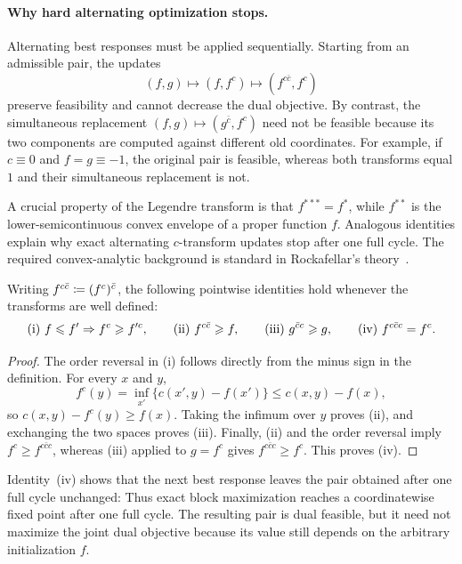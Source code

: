 \paragraph{Why hard alternating optimization stops.}

Alternating best responses must be applied sequentially. Starting from an admissible pair, the updates
\[
	(f,g)\longmapsto(f,f^c)\longmapsto(f^{c\bar c},f^c)
\]
preserve feasibility and cannot decrease the dual objective. By contrast, the simultaneous replacement $(f,g)\mapsto(g^{\bar c},f^c)$ need not be feasible because its two components are computed against different old coordinates. For example, if $c\equiv0$ and $f=g\equiv-1$, the original pair is feasible, whereas both transforms equal $1$ and their simultaneous replacement is not.

A crucial property of the Legendre transform is that $f^{***}=f^*$, while $f^{**}$ is the lower-semicontinuous convex envelope of a proper function $f$. Analogous identities explain why exact alternating $c$-transform updates stop after one full cycle. The required convex-analytic background is standard in Rockafellar's theory~\cite{rockafellar2015convex}.

\begin{prop}\label{prop-c-transform-algebra}
Writing $f^{c\bar c}\coloneqq(f^c)^{\bar c}$, the following pointwise identities hold whenever the transforms are well defined:
	\[
		\textnormal{(i) } f \leqslant f' \Rightarrow f^{c}\geqslant f'^{c},
		\qquad
		\textnormal{(ii) } f^{c\bar{c}} \geqslant f,
		\qquad
		\textnormal{(iii) } g^{\bar{c}c} \geqslant g,
		\qquad
		\textnormal{(iv) } f^{c\bar{c}c}=f^{c}.
	\]
\end{prop}

\begin{proof}
	The order reversal in (i) follows directly from the minus sign in the definition. For every $x$ and $y$,
	\[
		f^c(y)=\inf_{x'}\{c(x',y)-f(x')\}
		\leq c(x,y)-f(x),
	\]
	so $c(x,y)-f^c(y)\geq f(x)$. Taking the infimum over $y$ proves (ii), and exchanging the two spaces proves (iii). Finally, (ii) and the order reversal imply
	$f^c\geq f^{c\bar c c}$, whereas (iii) applied to $g=f^c$ gives
	$f^{c\bar c c}\geq f^c$. This proves (iv).
\end{proof}

Identity~(iv) shows that the next best response leaves the pair obtained after one full cycle unchanged:
Thus exact block maximization reaches a coordinatewise fixed point after one full cycle. The resulting pair is dual feasible, but it need not maximize the joint dual objective because its value still depends on the arbitrary initialization $f$.


